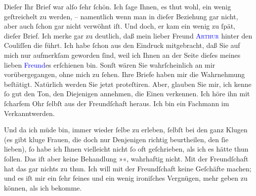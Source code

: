 \pstart
           Dieſer Ihr Brief war alſo ſehr ſchön. Ich ſage Ihnen, es thut wohl, ein wenig
               geſtreichelt zu werden, – namentlich wenn man in dieſer Beziehung gar nicht, aber
               auch ſchon gar nicht verwöhnt iſt. Und doch, er kam ein wenig zu ſpät, dieſer Brief.
               Ich merke gar zu deutlich, daß mein lieber Freund \textsc{\textcolor{blue}{Arthur}{}\ledrightnote{}} hinter den Couliſſen die \label{K_L03524-1v}\label{K_L03524-1h} führt. Ich habe ſchon aus \label{T_L03524-1v}\label{T_L03524-1h}{ }{\pb}den Eindruck mitgebracht, \strikeout{\textcolor{gray}{×}\-\textcolor{gray}{×}\-\textcolor{gray}{×}} daß Sie auf mich nur aufmerkſam geworden ſind, weil ich Ihnen an der Seite
               dieſes meines lieben \textcolor{blue}{Freund}{}\ledrightnote{{$\rightarrow$}}es
               erſchienen bin. Sonſt wären Sie wahrſcheinlich an mir vorübergegangen, ohne mich zu
               ſehen. Ihre Briefe haben mir die Wahrnehmung beſtätigt. Natürlich werden Sie jetzt
               proteſtiren. Aber, glauben Sie mir, ich kenne ſo gut den Ton, den Diejenigen
               annehmen, die Einen verkennen. Ich höre ihn mit ſcharfem Ohr ſelbſt aus der
               Freundſchaft heraus. Ich bin ein Fachmann im Verkanntwerden.\pend
           
\pstart
           Und da ich müde bin, immer wieder \label{K_L03524-2v}\label{K_L03524-2h} ſelbe zu erleben, ſelbſt bei den ganz Klugen (es
               gibt kluge Frauen, die doch {\pb}nur Denjenigen richtig
               beurtheilen, den ſie lieben), ſo habe ich Ihnen vielleicht nicht ſo oft geſchrieben,
               als ich es hätte thun ſollen. Das iſt aber keine Behandlung »\label{K_L03524-3v}\label{K_L03524-3h}«,
               wahrhaftig nicht. Mit der Freundſchaft hat das gar nichts zu thun. Ich will mit der
               Freundſchaft keine Geſchäfte machen; und es iſt mir ein ſehr feines und ein wenig
               ironiſches Vergnügen, mehr geben zu können, als ich bekomme.\pend
           
